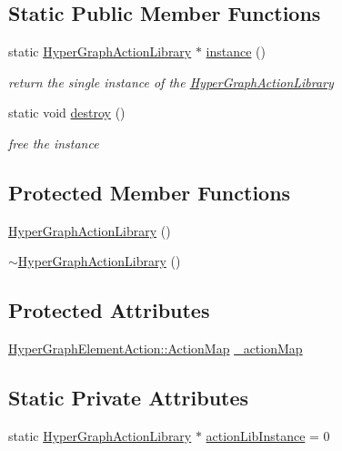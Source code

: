 \subsection*{Static Public Member Functions}
\begin{DoxyCompactItemize}
\item 
static \mbox{\hyperlink{classg2o_1_1_hyper_graph_action_library}{Hyper\+Graph\+Action\+Library}} $\ast$ \mbox{\hyperlink{classg2o_1_1_hyper_graph_action_library_a12074e3f4d9bcb3da20a4fe23d18b745}{instance}} ()
\begin{DoxyCompactList}\small\item\em return the single instance of the \mbox{\hyperlink{classg2o_1_1_hyper_graph_action_library}{Hyper\+Graph\+Action\+Library}} \end{DoxyCompactList}\item 
static void \mbox{\hyperlink{classg2o_1_1_hyper_graph_action_library_aa235ae7c242c522518b07d019dbf8a51}{destroy}} ()
\begin{DoxyCompactList}\small\item\em free the instance \end{DoxyCompactList}\end{DoxyCompactItemize}
\subsection*{Protected Member Functions}
\begin{DoxyCompactItemize}
\item 
\mbox{\hyperlink{classg2o_1_1_hyper_graph_action_library_a68fe0eee5bdda62e6929c3ee2b4b38f1}{Hyper\+Graph\+Action\+Library}} ()
\item 
\mbox{\hyperlink{classg2o_1_1_hyper_graph_action_library_af0d04ecf012d498c09d68725aaf939e5}{$\sim$\+Hyper\+Graph\+Action\+Library}} ()
\end{DoxyCompactItemize}
\subsection*{Protected Attributes}
\begin{DoxyCompactItemize}
\item 
\mbox{\hyperlink{classg2o_1_1_hyper_graph_element_action_abc889fc90ae1bbb63d90c7993777417a}{Hyper\+Graph\+Element\+Action\+::\+Action\+Map}} \mbox{\hyperlink{classg2o_1_1_hyper_graph_action_library_afc9e9b39a743700dcfc896b50d176b3b}{\+\_\+action\+Map}}
\end{DoxyCompactItemize}
\subsection*{Static Private Attributes}
\begin{DoxyCompactItemize}
\item 
static \mbox{\hyperlink{classg2o_1_1_hyper_graph_action_library}{Hyper\+Graph\+Action\+Library}} $\ast$ \mbox{\hyperlink{classg2o_1_1_hyper_graph_action_library_a65d1811736d86ff9f6453a728cac160f}{action\+Lib\+Instance}} = 0
\end{DoxyCompactItemize}


